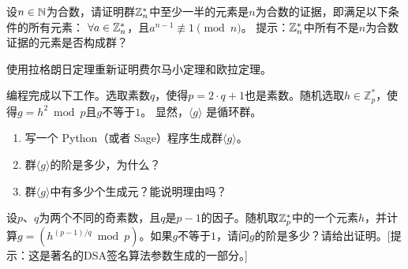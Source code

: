 \begin{problemset}
 \item 设$n\in {\mathbb N}$为合数，请证明群${\mathbb Z}_n^*$中至少一半的元素是$n$为合数的证据，即满足以下条件的所有元素：
$\forall a \in {\mathbb Z}_n^*$，且$a^{n-1}  \not\equiv 1 \pmod{n}$。
  提示：${\mathbb Z}_n^*$中所有不是$n$为合数证据的元素是否构成群？%
 
 \item 使用拉格朗日定理重新证明费尔马小定理和欧拉定理。
 		
 \item 编程完成以下工作。选取素数$q$，使得$p = 2 \cdot q + 1$也是素数。随机选取$h \in \mathbb{Z}_p^*$，使得$g = h^2 \bmod p$且$g $不等于$1$。
 		显然，$\langle g \rangle$ 是循环群。
 		\begin{enumerate}
 		\item 写一个 Python（或者 Sage）程序生成群$\langle g \rangle$。
 		
 		\item 群$\langle g \rangle$的阶是多少，为什么？
 		
 		\item 群$\langle g \rangle$中有多少个生成元？能说明理由吗？
 		
 		\end{enumerate}
 		
 \item 设$p$、$q$为两个不同的奇素数，且$q$是$p-1$的因子。随机取${\mathbb Z}_p^*$中的一个元素$h$，并计算$g = (h^{(p-1)/q } \bmod p)$。如果$g$不等于$1$，请问$g$的阶是多少？请给出证明。[提示：这是著名的DSA签名算法参数生成的一部分。]
 		
 \end{problemset}
